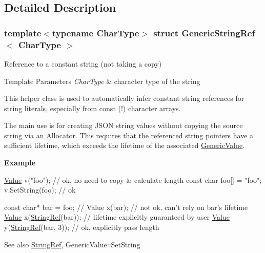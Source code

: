 \subsection{Detailed Description}
\subsubsection*{template$<$typename Char\+Type$>$\newline
struct Generic\+String\+Ref$<$ Char\+Type $>$}

Reference to a constant string (not taking a copy) 


\begin{DoxyTemplParams}{Template Parameters}
{\em Char\+Type} & character type of the string\\
\hline
\end{DoxyTemplParams}
This helper class is used to automatically infer constant string references for string literals, especially from {\ttfamily const} {\bfseries }(!) character arrays.

The main use is for creating J\+S\+ON string values without copying the source string via an Allocator. This requires that the referenced string pointers have a sufficient lifetime, which exceeds the lifetime of the associated \hyperlink{a01992}{Generic\+Value}.

{\bfseries Example} 
\begin{DoxyCode}
\hyperlink{a01992}{Value} v(\textcolor{stringliteral}{"foo"});   \textcolor{comment}{// ok, no need to copy & calculate length}
\textcolor{keyword}{const} \textcolor{keywordtype}{char} foo[] = \textcolor{stringliteral}{"foo"};
v.SetString(foo); \textcolor{comment}{// ok}

\textcolor{keyword}{const} \textcolor{keywordtype}{char}* bar = foo;
\textcolor{comment}{// Value x(bar); // not ok, can't rely on bar's lifetime}
\hyperlink{a01992}{Value} x(\hyperlink{a02008_aa6b9fd9f6aa49405a574c362ba9af6b5}{StringRef}(bar)); \textcolor{comment}{// lifetime explicitly guaranteed by user}
\hyperlink{a01992}{Value} y(\hyperlink{a02008_aa6b9fd9f6aa49405a574c362ba9af6b5}{StringRef}(bar, 3));  \textcolor{comment}{// ok, explicitly pass length}
\end{DoxyCode}


\begin{DoxySeeAlso}{See also}
\hyperlink{a02008_aa6b9fd9f6aa49405a574c362ba9af6b5}{String\+Ref}, Generic\+Value\+::\+Set\+String 
\end{DoxySeeAlso}


